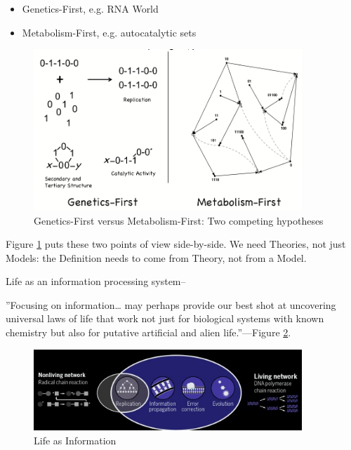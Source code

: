 \documentclass[]{article}
\begin{document}
\begin{itemize}
	\item Genetics-First, e.g. RNA World
	\item Metabolism-First, e.g. autocatalytic sets
\end{itemize}

\begin{figure}[H]
	\caption[Genetics-First versus Metabolism-First]{Genetics-First versus Metabolism-First: Two competing hypotheses}\label{fig:GeneticsVsMetabolism}
	\includegraphics[width=0.9\textwidth]{GeneticsVsMetabolism}
\end{figure}

Figure \ref{fig:GeneticsVsMetabolism} puts these two points of view side-by-side. We need Theories, not just Models: the Definition needs to come from Theory, not from a Model.

Life as an information processing system--\cite{nurse2008life}

''Focusing on information… may perhaps provide our best shot at uncovering universal laws of life that work not just for biological systems with known chemistry but also for putative artificial and alien life.''--\cite{cronin2016beyond}--Figure \ref{fig:LifeInformation}.

\begin{figure}[H]
	\caption{Life as Information}\label{fig:LifeInformation}
	\includegraphics[width=0.9\textwidth]{LifeInformation}
\end{figure}
\end{document}
